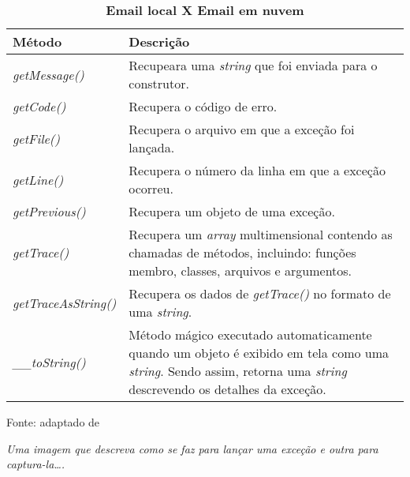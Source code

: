 \begin{table}[h!tb]
	\centering
	\setlength{\belowcaptionskip}{9pt}
	\caption[Métodos públicos da classe \textit{Exception}]{\textbf{Email local X
	Email em nuvem}}
	\begin{tabular}{| l | p{} |}

		\hline
		\textbf{Método}
		& \textbf{Descrição} \\
		\hline

        \textit{getMessage()}
        & Recupeara uma \textit{string} que foi enviada
        para o construtor.

        \\ \cline{1-2}
        \textit{getCode()}
        & Recupera o código de erro.
        \\ \cline{1-2}

        \textit{getFile()}
        & Recupera o arquivo em que a exceção foi lançada.
        \\ \cline{1-2}

        \textit{getLine()}
        & Recupera o número da linha em que a exceção ocorreu.
        \\ \cline{1-2}

        \textit{getPrevious()}
        & Recupera um objeto de uma exceção.
        \\ \cline{1-2}

        \textit{getTrace()}
        & Recupera um \textit{array} multimensional contendo as chamadas de
        métodos, incluindo: funções membro, classes, arquivos e argumentos. \\
        \cline{1-2}

        \textit{getTraceAsString()}
        & Recupera os dados de \textit{getTrace()} no formato de uma
        \textit{string}.
        \\ \cline{1-2}

        \textit{\_\_toString()}
        & Método mágico executado automaticamente quando um objeto é exibido em
        tela como uma \textit{string}. Sendo assim, retorna uma \textit{string}
        descrevendo os detalhes da exceção.
        \\
        \hline
	\end{tabular}
	\newline
	\newline
	\label{tab:excecao}
	\begin{footnotesize}
		Fonte: adaptado de \cite[p.53]{phpObjectsPatternsAndPractice}
	\end{footnotesize}
\end{table}

\FloatBarrier 	%

\textit{Uma imagem que descreva como se faz para lançar uma exceção e outra
para captura-la\ldots.}